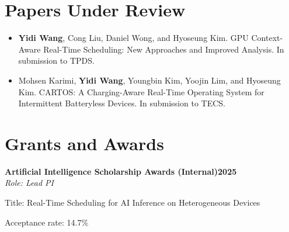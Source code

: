 \documentclass[letterpaper,10pt]{article}
\newcommand{\heading}[2]{
  \hspace{10pt}#1\hfill#2\\
}
\newcommand{\headingBf}[2]{
  \heading{\textbf{#1}}{\textbf{#2}}
}
\newcommand{\headingIt}[2]{
  \heading{\textit{#1}}{\textit{#2}}
}
\newenvironment{resume_list}{
  \vspace{-7pt}
  \begin{itemize}[itemsep=-2px, parsep=1pt, leftmargin=30pt]
}{
  \end{itemize}
}
\newcommand{\itemTitle}[1]{
  \item[] \underline{#1}\vspace{4pt}
}
\begin{document}
\section{Papers Under Review}
\begin{justify}
\begin{itemize}
    \item \textbf{Yidi Wang}, Cong Liu, Daniel Wong, and Hyoseung Kim. GPU Context-Aware Real-Time Scheduling: New Approaches and Improved Analysis. In submission to TPDS.
    \item Mohsen Karimi, \textbf{Yidi Wang}, Youngbin Kim, Yoojin Lim, and Hyoseung Kim. CARTOS: A Charging-Aware Real-Time Operating System for Intermittent Batteryless Devices. In submission to TECS.
\end{itemize}
\end{justify}

\section{Grants and Awards}
\headingBf{Artificial Intelligence Scholarship Awards (Internal)}{2025}
\headingIt{Role: Lead PI}{}
\begin{resume_list}
    \item Title: Real-Time Scheduling for AI Inference on Heterogeneous Devices
    \item Acceptance rate: 14.7\%
\end{resume_list}

    


\end{document}
